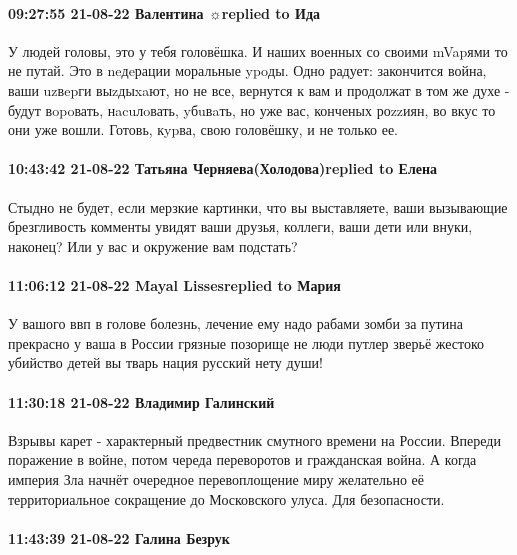 \paragraph{09:27:55 21-08-22 Валентина ☼replied to Ида}

У людей головы, это у тебя головёшка. И наших военных со своими mVapями то не
путай. Это в neдeрации моральные ypoды. Одно радует: закончится война, ваши
uzвepги выzдыxaют, но не все, вернутся к вам и продолжат в том же духе - будут
вopoвать, нacuлoвать, yбuвaть, но уже вас, конченых роzzиян, во вкус то они уже
вошли. Готовь, кypва, свою головёшку, и не только ее.

\paragraph{10:43:42 21-08-22 Татьяна Черняева(Холодова)replied to Елена}

Стыдно не будет, если мерзкие картинки, что вы выставляете, ваши вызывающие
брезгливость комменты увидят ваши друзья, коллеги, ваши дети или внуки,
наконец? Или у вас и окружение вам подстать?

\paragraph{11:06:12 21-08-22 Mayal Lissesreplied to Мария}

У вашого ввп в голове болезнь, лечение ему надо рабами зомби за путина прекрасно у ваша в России грязные позорище не люди путлер зверьё жестоко убийство детей вы тварь нация русский нету души!

\paragraph{11:30:18 21-08-22 Владимир Галинский}

Взрывы карет - характерный предвестник смутного времени на России.
Впереди поражение в войне, потом череда переворотов и гражданская война. А когда империя Зла начнёт очередное перевоплощение миру желательно её территориальное сокращение до Московского улуса. Для безопасности.

\paragraph{11:43:39 21-08-22 Галина Безрук}

